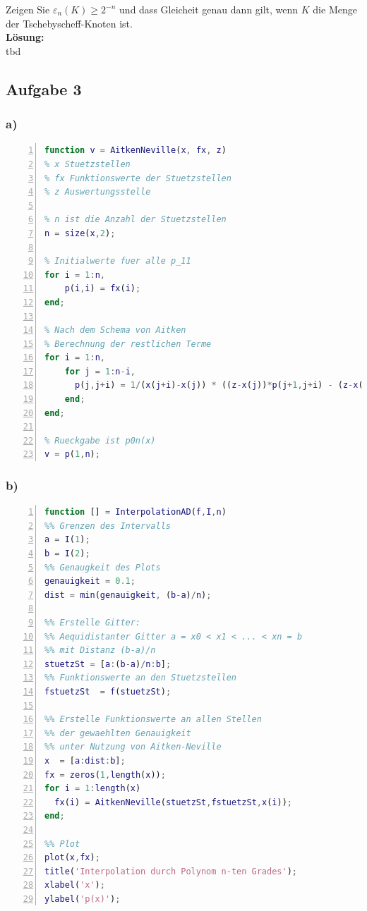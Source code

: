 \documentclass[11pt,a4paper,ngerman]{article}
\begin{document}
Zeigen Sie $\varepsilon_n(K) \geq 2^{-n}$ und dass Gleicheit genau dann gilt, wenn $K$ die Menge
der Tschebyscheff-Knoten ist.\\

\textbf{Lösung:}\\

tbd


\subsection*{Aufgabe 3}


\subsubsection*{a)}
\begin{lstlisting}[language=matlab,numbers=left]
function v = AitkenNeville(x, fx, z)
% x Stuetzstellen
% fx Funktionswerte der Stuetzstellen
% z Auswertungsstelle

% n ist die Anzahl der Stuetzstellen
n = size(x,2);

% Initialwerte fuer alle p_11
for i = 1:n,
    p(i,i) = fx(i);
end;

% Nach dem Schema von Aitken
% Berechnung der restlichen Terme
for i = 1:n,
    for j = 1:n-i,
      p(j,j+i) = 1/(x(j+i)-x(j)) * ((z-x(j))*p(j+1,j+i) - (z-x(j+i))*p(j,j+i-1));
    end;
end;

% Rueckgabe ist p0n(x)
v = p(1,n);
\end{lstlisting}
\subsubsection*{b)}
\begin{lstlisting}[language=matlab,numbers=left]
function [] = InterpolationAD(f,I,n)
%% Grenzen des Intervalls
a = I(1);
b = I(2);
%% Genaugkeit des Plots
genauigkeit = 0.1;
dist = min(genauigkeit, (b-a)/n);

%% Erstelle Gitter:
%% Aequidistanter Gitter a = x0 < x1 < ... < xn = b
%% mit Distanz (b-a)/n
stuetzSt = [a:(b-a)/n:b];
%% Funktionswerte an den Stuetzstellen
fstuetzSt  = f(stuetzSt);

%% Erstelle Funktionswerte an allen Stellen
%% der gewaehlten Genauigkeit
%% unter Nutzung von Aitken-Neville
x  = [a:dist:b];
fx = zeros(1,length(x));
for i = 1:length(x)
  fx(i) = AitkenNeville(stuetzSt,fstuetzSt,x(i));
end;

%% Plot
plot(x,fx);
title('Interpolation durch Polynom n-ten Grades');
xlabel('x');
ylabel('p(x)');
\end{lstlisting}
\end{document}
